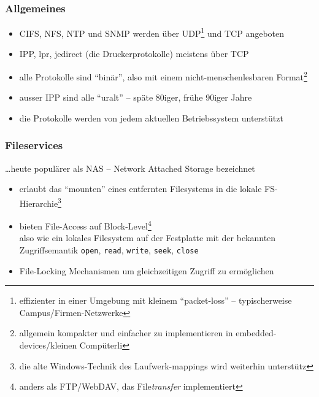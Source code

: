 \documentclass[ignorenonframetext]{beamer}
\begin{document}
\begin{frame}
\frametitle{Allgemeines}
\begin{itemize}
	\item CIFS, NFS, NTP und SNMP werden \"uber UDP\footnote{effizienter in einer Umgebung mit kleinem ``packet-loss'' -- typischerweise Campus/Firmen-Netzwerke} und TCP angeboten
	\item IPP, lpr, jedirect (die Druckerprotokolle) meistens \"uber TCP
	\item alle Protokolle sind ``bin\"ar'', also mit einem nicht-menschenlesbaren Format\footnote{allgemein kompakter und einfacher zu implementieren in embedded-devices/kleinen Comp\"uterli}
	\item ausser IPP sind alle ``uralt'' -- sp\"ate 80iger, fr\"uhe 90iger Jahre
	\item die Protokolle werden von jedem aktuellen Betriebssystem unterst\"utzt
\end{itemize}
\end{frame}



\begin{frame}
\frametitle{Fileservices}
\ldots heute popul\"arer als NAS -- Network Attached Storage bezeichnet
\begin{itemize}
	\item erlaubt das ``mounten'' eines entfernten Filesystems in die lokale FS-Hierarchie\footnote{die alte Windows-Technik des Laufwerk-mappings wird weiterhin unterst\"utz}
	\item bieten File-Access auf Block-Level\footnote{anders als FTP/WebDAV, das File{\em transfer} implementiert}\\
	also wie ein lokales Filesystem auf der Festplatte mit der bekannten
	Zugriffsemantik \texttt{open}, \texttt{read}, \texttt{write}, \texttt{seek}, \texttt{close}
	\item File-Locking Mechanismen um gleichzeitigen Zugriff zu erm\"oglichen
\end{itemize}
\end{frame}
\end{document}
